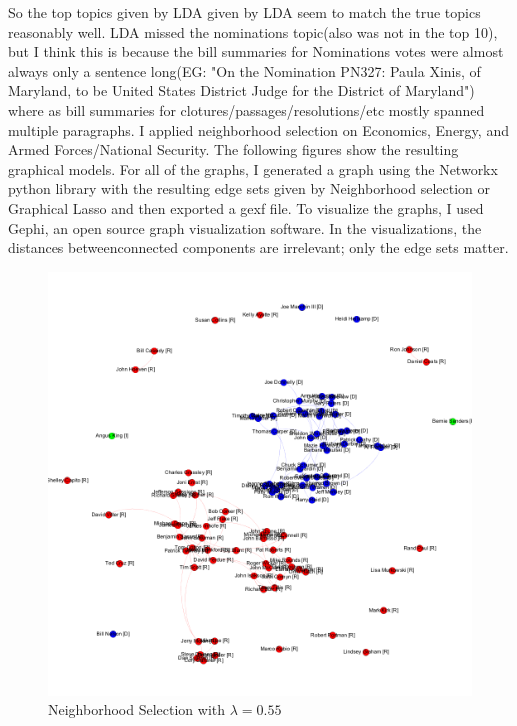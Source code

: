 \documentclass{article}
\begin{document}
So the top topics given by LDA given by LDA seem to match the true topics reasonably well. LDA missed the nominations topic(also was not in the top 10), but I think this is because the bill summaries for Nominations votes were almost always only a sentence long(EG: "On the Nomination PN327: Paula Xinis, of Maryland, to be United States District Judge for the District of Maryland") where as bill summaries for clotures/passages/resolutions/etc mostly spanned multiple paragraphs. I applied neighborhood selection on Economics, Energy, and Armed Forces/National Security. The following figures show the resulting graphical models. For all of the graphs, I generated a graph using the Networkx python library with the resulting edge sets given by Neighborhood selection or Graphical Lasso and then exported a gexf file. To visualize the graphs, I used Gephi, an open source graph visualization software. In the visualizations, the distances betweenconnected components are irrelevant; only the edge sets matter.

\begin{figure} 
\caption{\label{fig: nbd55}Neighborhood Selection with $\lambda = 0.55$}
  \includegraphics[width=\textwidth]{nbd_55_all.png}
\end{figure}
\end{document}
